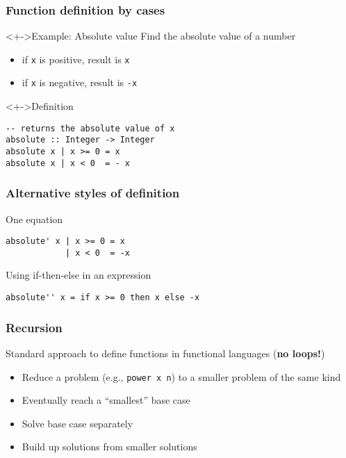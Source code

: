 \documentclass{beamer}
\subtitle{Functions}
\begin{document}
\begin{frame}
  \titlepage
\end{frame}
\begin{frame}[fragile]
  \frametitle{Function definition by cases}
  \begin{block}<+->{Example: Absolute value}
    Find the absolute value of a number
    \begin{itemize}
    \item if \texttt{x} is positive, result is \texttt{x}
    \item if \texttt{x} is negative, result is \texttt{-x}
    \end{itemize}
  \end{block}
  \begin{block}<+->{Definition}
\begin{verbatim}
-- returns the absolute value of x
absolute :: Integer -> Integer
absolute x | x >= 0 = x
absolute x | x < 0  = - x
\end{verbatim}
  \end{block}
\end{frame}

\begin{frame}
  \frametitle{Alternative styles of definition}
  
  \begin{block}{One equation}
\begin{verbatim}
absolute' x | x >= 0 = x
            | x < 0  = -x
\end{verbatim}
  \end{block}
  
  \begin{block}{Using if-then-else in an expression}
\begin{verbatim}
absolute'' x = if x >= 0 then x else -x
\end{verbatim}
  \end{block}
\end{frame}

\begin{frame}
  \frametitle{Recursion}
  Standard approach to define functions in functional languages
  (\textbf{no loops!})
  \begin{itemize}
  \item
    Reduce a problem (e.g., \texttt{power x n}) to a smaller
    problem of the same kind 
  \item Eventually reach a ``smallest'' base case 
  \item Solve base case separately 
  \item Build up solutions from smaller solutions
  \end{itemize}
\end{frame}
\end{document}
